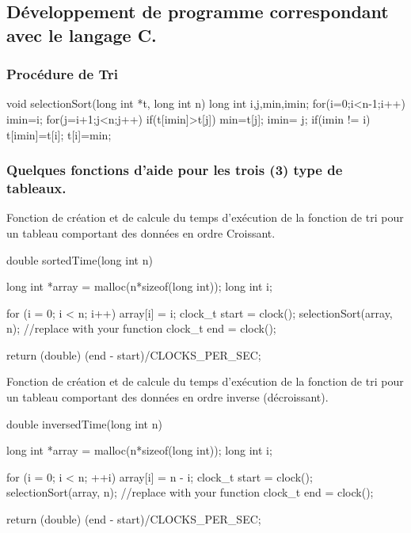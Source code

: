 \documentclass[12pt]{article}
\begin{document}
\subsection{Développement de programme correspondant avec le langage C.}
\subsubsection{Procédure de Tri}
\begin{sql}
void selectionSort(long int *t, long int n){
    long int i,j,min,imin;
    for(i=0;i<n-1;i++){
        imin=i;
        for(j=i+1;j<n;j++){
           if(t[imin]>t[j]){
              min=t[j];
              imin= j;
           }
        }
        if(imin != i){
           t[imin]=t[i];
           t[i]=min;
        }
    }
}
\end{sql}

\subsubsection{Quelques fonctions d'aide pour les trois (3) type de tableaux. }

Fonction de création et de calcule du temps d'exécution de la fonction de tri pour un tableau comportant des données en ordre Croissant.
\begin{sql}
double sortedTime(long int n) {
    
  long int *array = malloc(n*sizeof(long int));
  long int i;
  
  for (i = 0; i < n; i++)
  {
      array[i] = i;
  }
  clock_t start = clock();
  selectionSort(array, n); //replace with your function 
  clock_t end = clock();
  
  return (double) (end - start)/CLOCKS_PER_SEC;
}

\end{sql}

Fonction de création et de calcule du temps d'exécution de la fonction de tri pour un tableau comportant des données en ordre inverse (décroissant). 
\begin{sql}
double inversedTime(long int n) {
    
  long int *array = malloc(n*sizeof(long int));
  long int i;
  
  for (i = 0; i < n; ++i)
  {
    array[i] = n - i;
  }
  clock_t start = clock();
  selectionSort(array, n); //replace with your function 
  clock_t end = clock();

  return (double) (end - start)/CLOCKS_PER_SEC;
}
\end{sql}
\end{document}

